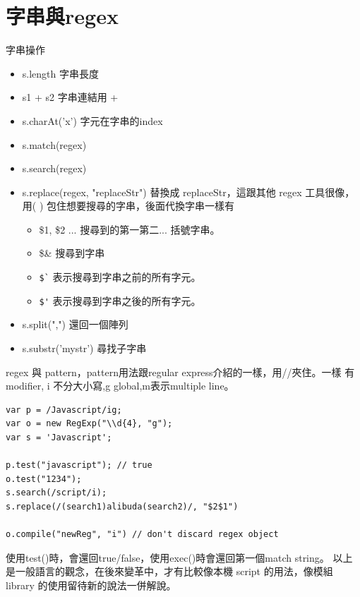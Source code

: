 \section{字串與regex}
字串操作
\begin{itemize}
  \item s.length 字串長度
  \item s1 + s2 字串連結用 +
  \item s.charAt('x') 字元在字串的index
  \item s.match(regex)
  \item s.search(regex)
  \item s.replace(regex, "replaceStr") 替換成 replaceStr，這跟其他 regex
    工具很像，用( ) 包住想要搜尋的字串，後面代換字串一樣有
    \begin{itemize}
      \item \$1, \$2 ... 搜尋到的第一第二... 括號字串。
      \item \$\& 搜尋到字串
      \item \verb=$`= 表示搜尋到字串之前的所有字元。
      \item \verb=$'= 表示搜尋到字串之後的所有字元。
    \end{itemize}
  \item s.split(",") 還回一個陣列
  \item s.substr('mystr') 尋找子字串
\end{itemize}
regex 與 pattern，pattern用法跟regular express介紹的一樣，用//夾住。一樣
有modifier, i 不分大小寫,g global,m表示multiple line。
\begin{verbatim}
var p = /Javascript/ig;
var o = new RegExp("\\d{4}, "g");
var s = 'Javascript';

p.test("javascript"); // true
o.test("1234");
s.search(/script/i);
s.replace(/(search1)alibuda(search2)/, "$2$1")

o.compile("newReg", "i") // don't discard regex object
\end{verbatim}
使用test()時，會還回true/false，使用exec()時會還回第一個match string。
以上是一般語言的觀念，在後來變革中，才有比較像本機 script 的用法，像模組
library 的使用留待新的說法一併解說。


